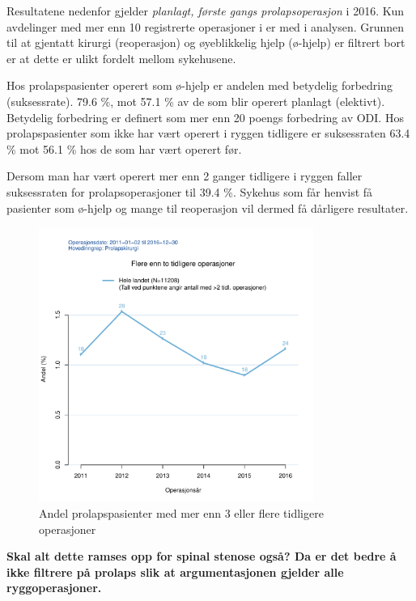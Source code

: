 \documentclass [norsk,a4paper,twoside]{article}\usepackage[]{graphicx}\usepackage[]{color}
\begin{document}
Resultatene nedenfor gjelder  \textit{planlagt, første gangs prolapsoperasjon} i 2016. 
Kun avdelinger med mer enn 10 registrerte operasjoner i er med i
analysen. Grunnen til at gjentatt kirurgi (reoperasjon) og øyeblikkelig hjelp (ø-hjelp)
er filtrert bort er at dette er ulikt fordelt mellom sykehusene.


Hos prolapspasienter operert som ø-hjelp er andelen med betydelig forbedring (suksessrate).  79.6 \%, mot 57.1 \% av de som blir operert planlagt (elektivt). Betydelig forbedring er definert som mer enn 20 poengs forbedring av ODI.
Hos prolapspasienter som ikke har vært operert i ryggen tidligere er suksessraten 63.4 \% mot 56.1 \%
hos de som har vært operert før. 

Dersom man har vært operert mer enn 2 ganger tidligere i
ryggen faller suksessraten for prolapsoperasjoner til 39.4 \%. Sykehus som får henvist få pasienter som ø-hjelp og
mange til reoperasjon vil dermed få dårligere resultater.


\begin{figure}[ht]
\centering \includegraphics[width= 0.8\textwidth]{FigTidlOpAnt3.pdf}
\caption{\label{fig:TidlOpAnt3} Andel prolapspasienter med mer enn 3 eller flere tidligere operasjoner}
\end{figure}

\textbf{Skal alt dette ramses opp for spinal stenose også? Da er det bedre å ikke filtrere på prolaps slik at argumentasjonen gjelder alle ryggoperasjoner.}
\end{document}
